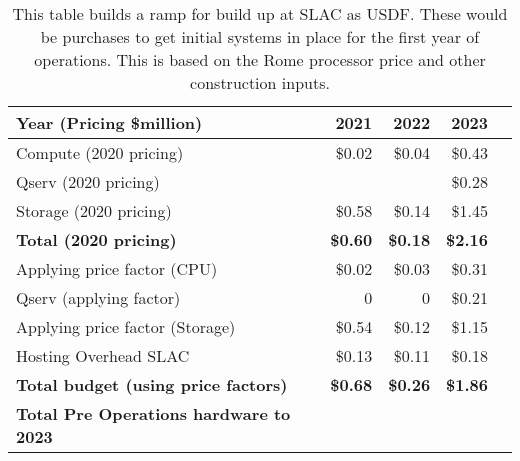 \tiny \begin{longtable} { |p{}  |r  |r  |r  |r |} 
\caption{This table builds a ramp for build up at SLAC as USDF. These would be purchases to get initial systems in place for the first year of operations. This is based on the Rome processor price and other construction inputs. \label{tab:preOps}}\\ 
\hline 
\textbf{Year (Pricing \$million)}&\textbf{2021}&\textbf{2022}&\textbf{2023} \\ \hline
{Compute (2020 pricing)}&{\$0.02}&{\$0.04}&{\$0.43} \\ \hline
{Qserv (2020 pricing)}&{}&{}&{\$0.28} \\ \hline
{Storage (2020 pricing)}&{\$0.58}&{\$0.14}&{\$1.45} \\ \hline
\textbf{Total (2020 pricing)}&\textbf{\$0.60}&\textbf{\$0.18}&\textbf{\$2.16} \\ \hline
{Applying price factor (CPU)}&{\$0.02}&{\$0.03}&{\$0.31} \\ \hline
{Qserv (applying factor)}&{0}&{0}&{\$0.21} \\ \hline
{Applying price factor (Storage)}&{\$0.54}&{\$0.12}&{\$1.15} \\ \hline
{Hosting Overhead SLAC}&{\$0.13}&{\$0.11}&{\$0.18} \\ \hline
\textbf{Total budget (using price factors)}&\textbf{\$0.68}&\textbf{\$0.26}&\textbf{\$1.86} \\ \hline
\textbf{Total Pre Operations hardware to 2023}&&& \\ \hline
\end{longtable} \normalsize
